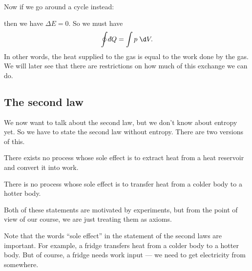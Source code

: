 \documentclass[a4paper]{article}
\def\di{{\mathchar'26\mkern-12mu d}}
\begin{document}
Now if we go around a cycle instead:
\begin{center}
\end{center}
then we have $\Delta E = 0$. So we must have
\[
  \oint \di Q = \int p \;\d V.
\]
In other words, the heat supplied to the gas is equal to the work done by the gas. We will later see that there are restrictions on how much of this exchange we can do.

\subsection{The second law}
We now want to talk about the second law, but we don't know about entropy yet. So we have to state the second law without entropy. There are two versions of this.

\begin{law}
  There exists no process whose sole effect is to extract heat from a heat reservoir and convert it into work.
\end{law}

\begin{law}
  There is no process whose sole effect is to transfer heat from a colder body to a hotter body.
\end{law}
Both of these statements are motivated by experiments, but from the point of view of our course, we are just treating them as axioms.

Note that the words ``sole effect'' in the statement of the second laws are important. For example, a fridge transfers heat from a colder body to a hotter body. But of course, a fridge needs work input --- we need to get electricity from somewhere.
\end{document}
